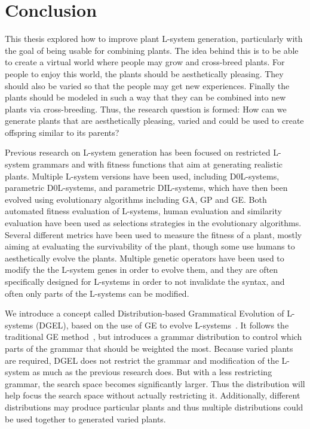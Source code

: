 \chapter{Conclusion}

This thesis explored how to improve plant \gls{L-system} generation, particularly with the goal of being usable for combining plants.
The idea behind this is to be able to create a virtual world where people may grow and cross-breed plants.
For people to enjoy this world, the plants should be aesthetically pleasing.
They should also be varied so that the people may get new experiences.
Finally the plants should be modeled in such a way that they can be combined into new plants via cross-breeding.
Thus, the research question is formed: How can we generate plants that are aesthetically pleasing, varied and could be used to create offspring similar to its parents?

Previous research on \gls{L-system} generation has been focused on restricted \gls{L-system} grammars and with fitness functions that aim at generating realistic plants.
Multiple \gls{L-system} versions have been used, including D0L-systems, parametric D0L-systems, and parametric DIL-systems, which have then been evolved using evolutionary algorithms including \gls{GA}, \gls{GP} and \gls{GE}.
Both automated fitness evaluation of \glspl{L-system}, human evaluation and similarity evaluation have been used as selections strategies in the evolutionary algorithms.
Several different metrics have been used to measure the fitness of a plant, mostly aiming at evaluating the survivability of the plant, though some use humans to aesthetically evolve the plants.
Multiple genetic operators have been used to modify the the \gls{L-system} genes in order to evolve them, and they are often specifically designed for \glspl{L-system} in order to not invalidate the syntax, and often only parts of the \glspl{L-system} can be modified.

We introduce a concept called Distribution-based Grammatical Evolution of \glspl{L-system} (DGEL), based on the use of \gls{GE} to evolve \glspl{L-system}~\cite{1998Ryan,2003Ortega,2009Beaumont}.
It follows the traditional \gls{GE} method~\cite{1998Ryan}, but introduces a grammar distribution to control which parts of the grammar that should be weighted the most.
Because varied plants are required, \gls{DGEL} does not restrict the grammar and modification of the \gls{L-system} as much as the previous research does.
But with a less restricting grammar, the search space becomes significantly larger.
Thus the distribution will help focus the search space without actually restricting it.
Additionally, different distributions may produce particular plants and thus multiple distributions could be used together to generated varied plants.

